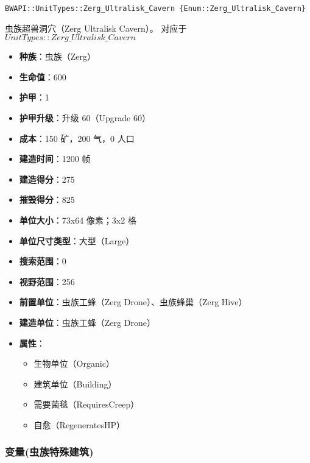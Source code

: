 \begin{tcolorbox}[colback=white, colframe=black!60!white, title=Zerg\_Ultralisk\_Cavern(), arc=0mm]
    \begin{verbatim}
BWAPI::UnitTypes::Zerg_Ultralisk_Cavern {Enum::Zerg_Ultralisk_Cavern}
    \end{verbatim}
    虫族超兽洞穴（Zerg Ultralisk Cavern）。
    对应于  $UnitTypes::Zerg\_Ultralisk\_Cavern$ 
    \begin{itemize}
        \item \textbf{种族}：虫族（Zerg）
        \item \textbf{生命值}：600
        \item \textbf{护甲}：1
        \item \textbf{护甲升级}：升级 60（Upgrade 60）
        \item \textbf{成本}：150 矿，200 气，0 人口
        \item \textbf{建造时间}：1200 帧
        \item \textbf{建造得分}：275
        \item \textbf{摧毁得分}：825
        \item \textbf{单位大小}：73x64 像素；3x2 格
        \item \textbf{单位尺寸类型}：大型（Large）
        \item \textbf{搜索范围}：0
        \item \textbf{视野范围}：256
        \item \textbf{前置单位}：虫族工蜂（Zerg Drone）、虫族蜂巢（Zerg Hive）
        \item \textbf{建造单位}：虫族工蜂（Zerg Drone）
        \item \textbf{属性}：
            \begin{itemize}
                \item 生物单位（Organic）
                \item 建筑单位（Building）
                \item 需要菌毯（RequiresCreep）
                \item 自愈（RegeneratesHP）
            \end{itemize}
        \end{itemize}
    \end{tcolorbox}

\subsubsection{变量(虫族特殊建筑)}

